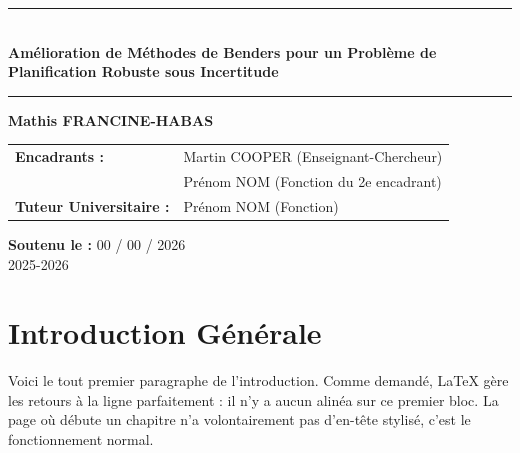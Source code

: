 \documentclass[12pt, a4paper, twoside]{report}
\begin{document}
\begin{titlepage}
    \vspace{2.5cm}

    \begin{center}
        {\color{mainblue}\rule{\textwidth}{2pt}} \\[0.6cm]
        {\sffamily \Huge \bfseries Amélioration de Méthodes de Benders pour un Problème de Planification Robuste sous Incertitude} \\[0.4cm] 
        {\color{mainblue}\rule{\textwidth}{2pt}}
    \end{center}

    \vspace{1.5cm}

    \begin{center}
        {\Large \textbf{Mathis FRANCINE-HABAS}} \\[1cm]
        
        \begin{tabular}{ll}
            \textbf{Encadrants :} & Martin COOPER (Enseignant-Chercheur) \\
                                  & Prénom NOM (Fonction du 2e encadrant) \\[0.3cm] %
            \textbf{Tuteur Universitaire :} & Prénom NOM (Fonction)
        \end{tabular}
    \end{center}

    \vfill

    \begin{center}
        {\large \textbf{Soutenu le :} 00 / 00 / 2026} \\
        \vspace{0.2cm}
        {\large 2025-2026}
    \end{center}
\end{titlepage}

\clearpage
\tableofcontents
\thispagestyle{empty}
\clearpage

\chapter{Introduction Générale}
Voici le tout premier paragraphe de l'introduction. Comme demandé, LaTeX gère les retours à la ligne parfaitement : il n'y a aucun alinéa sur ce premier bloc. La page où débute un chapitre n'a volontairement pas d'en-tête stylisé, c'est le fonctionnement normal.
\end{document}
